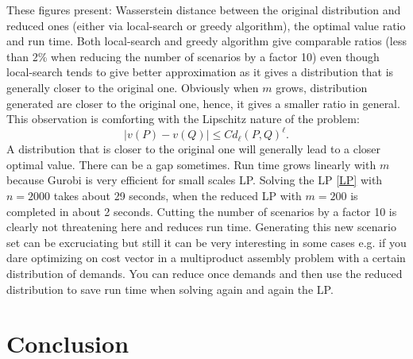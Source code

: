 \documentclass{amsart}
\begin{document}
These figures present: Wasserstein distance between the original distribution and reduced ones (either via local-search or greedy algorithm), the optimal value ratio and run time. Both local-search and greedy algorithm give comparable ratios (less than 2\% when reducing the number of scenarios by a factor 10) even though local-search tends to give better approximation as it gives a distribution that is generally closer to the original one. Obviously when $m$ grows, distribution generated are closer to the original one, hence, it gives a smaller ratio in general. This observation is comforting with the Lipschitz nature of the problem: $$\lvert v\left(P\right)-v\left(Q\right)\rvert \leq C d_\ell\left(P,Q\right)^\ell.$$ A distribution that is closer to the original one will generally lead to a closer optimal value. There can be a gap sometimes. Run time grows linearly with $m$ because Gurobi is very efficient for small scales LP. Solving the LP \ref{LP} with $n=2000$ takes about 29 seconds, when the reduced LP with $m=200$ is completed in about 2 seconds. Cutting the number of scenarios by a factor 10 is clearly not threatening here and reduces run time. Generating this new scenario set can be excruciating but still it can be very interesting in some cases e.g. if you dare optimizing on cost vector in a multiproduct assembly problem with a certain distribution of demands. You can reduce once demands and then use the reduced distribution to save run time when solving again and again the LP.
\section{Conclusion}
\clearpage


\end{document}
